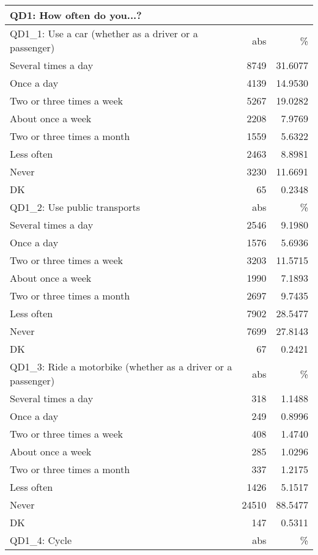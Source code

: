 \begin{table}
	\begin{tabularx}{\textwidth} { b{12cm} | r | r}
QD1: How often do you...? \\ \hline
QD1\_1: Use a car (whether as a driver or a passenger) & abs & \% \\ \hline
Several times a day          &   8749 & 31.6077 \\
Once a day                   &   4139 & 14.9530 \\
Two or three times a week    &   5267 & 19.0282 \\
About once a week            &   2208 &  7.9769 \\
Two or three times a month   &   1559 &  5.6322 \\
Less often                   &   2463 &  8.8981 \\
Never                        &   3230 & 11.6691 \\
DK                           &     65 &  0.2348 \\ \hline
QD1\_2: Use public transports & abs & \% \\ \hline

Several times a day          &   2546 &  9.1980 \\
Once a day                   &   1576 &  5.6936 \\
Two or three times a week    &   3203 & 11.5715 \\
About once a week            &   1990 &  7.1893 \\
Two or three times a month   &   2697 &  9.7435 \\
Less often                   &   7902 & 28.5477 \\
Never                        &   7699 & 27.8143 \\
DK                           &     67 &  0.2421 \\ \hline
QD1\_3: Ride a motorbike (whether as a driver or a passenger) & abs & \% \\ \hline

Several times a day          &    318 &  1.1488 \\
Once a day                   &    249 &  0.8996 \\
Two or three times a week    &    408 &  1.4740 \\
About once a week            &    285 &  1.0296 \\
Two or three times a month   &    337 &  1.2175 \\
Less often                   &   1426 &  5.1517 \\
Never                        &  24510 & 88.5477 \\
DK                           &    147 &  0.5311 \\ \hline
QD1\_4: Cycle & abs & \% \\ \hline


\end{tabularx}
\end{table}
